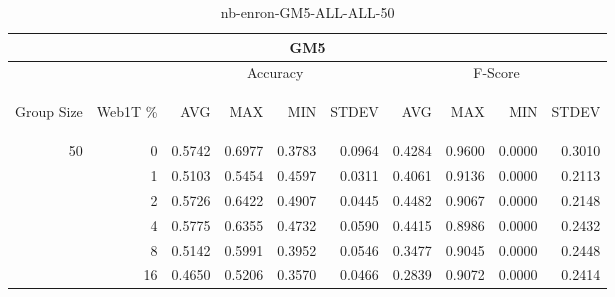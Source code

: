\begin{center}
\begin{table}[htbp] 
 \begin{center}
\begin{tabular}{ | r | r | r | r | r | r | r | r | r | r |}
\hline
\multicolumn{10}{|c|}{GM5}\\
\hline
 & & \multicolumn{4}{|c|}{Accuracy} & \multicolumn{4}{|c|}{F-Score}\\ \cline{3-10}
\begin{sideways}Group Size\end{sideways} & \begin{sideways}Web1T \%\end{sideways} & \begin{sideways}AVG\end{sideways} & \begin{sideways}MAX\end{sideways} & \begin{sideways}MIN\end{sideways} & \begin{sideways}STDEV\end{sideways} & \begin{sideways}AVG\end{sideways} & \begin{sideways}MAX\end{sideways} & \begin{sideways}MIN\end{sideways} & \begin{sideways}STDEV\end{sideways}\\
\hline
\multirow{5}{*}{50}
 & 0 & 0.5742 & 0.6977 & 0.3783 & 0.0964 & 0.4284 & 0.9600 & 0.0000 & 0.3010\\ \cline{2-10}
 & 1 & 0.5103 & 0.5454 & 0.4597 & 0.0311 & 0.4061 & 0.9136 & 0.0000 & 0.2113\\ \cline{2-10}
 & 2 & 0.5726 & 0.6422 & 0.4907 & 0.0445 & 0.4482 & 0.9067 & 0.0000 & 0.2148\\ \cline{2-10}
 & 4 & 0.5775 & 0.6355 & 0.4732 & 0.0590 & 0.4415 & 0.8986 & 0.0000 & 0.2432\\ \cline{2-10}
 & 8 & 0.5142 & 0.5991 & 0.3952 & 0.0546 & 0.3477 & 0.9045 & 0.0000 & 0.2448\\ \cline{2-10}
 & 16 & 0.4650 & 0.5206 & 0.3570 & 0.0466 & 0.2839 & 0.9072 & 0.0000 & 0.2414\\ \cline{2-10}
\hline
\end{tabular}
\caption{nb-enron-GM5-ALL-ALL-50}
\label{table:nb-enron-GM5-ALL-ALL-50}
\end{center}
 \end{table}
\end{center}

